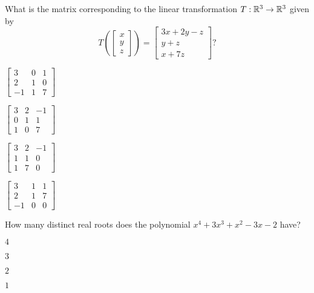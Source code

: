 \documentclass{article}
\begin{document}
\begin{readinessAssuranceTest}
\item What is the matrix corresponding to the linear transformation $T: \mathbb{R}^3 \rightarrow \mathbb{R}^3$ given by $$T\left( \begin{bmatrix} x \\ y \\ z \end{bmatrix}\right) = \begin{bmatrix} 3x+2y-z \\ y+z \\x+7z \end{bmatrix}?$$
\begin{multicols}{4}
\begin{readinessAssuranceTestChoices}
\item $\begin{bmatrix} 3 & 0 & 1 \\ 2 & 1 & 0 \\ -1 & 1 & 7 \end{bmatrix}$
\item $\begin{bmatrix} 3 & 2 & -1 \\ 0 & 1 & 1 \\ 1 & 0 & 7  \end{bmatrix}$ %
\item $\begin{bmatrix} 3 & 2 & -1 \\ 1 & 1 & 0 \\ 1 & 7 & 0 \end{bmatrix}$
\item $\begin{bmatrix}  3 & 1 & 1 \\ 2 & 1 & 7 \\ -1 & 0 & 0 \end{bmatrix}$
\end{readinessAssuranceTestChoices}
\end{multicols}

\item How many distinct real roots does the polynomial $x^4+3x^3+x^2-3x-2$ have?
\begin{multicols}{4}
\begin{readinessAssuranceTestChoices}
\item $4$
\item $3$ %
\item $2$
\item $1$
\end{readinessAssuranceTestChoices}
\end{multicols}



\end{readinessAssuranceTest}
\end{document}
